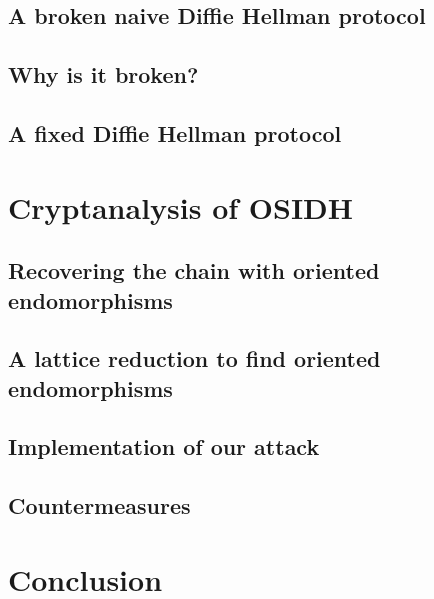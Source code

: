 \documentclass[10pt]{beamer}
\theoremstyle{plain}
\theoremstyle{definition}
\renewcommand{\(}{\left(}
\renewcommand{\)}{\right)}
\begin{document}
\subsection{A broken naive Diffie Hellman protocol}

\subsection{Why is it broken?}

\subsection{A fixed Diffie Hellman protocol}

\section{Cryptanalysis of OSIDH}

\subsection{Recovering the chain with oriented endomorphisms}

\subsection{A lattice reduction to find oriented endomorphisms}

\subsection{Implementation of our attack}

\subsection{Countermeasures}

\section{Conclusion}
\end{document}
